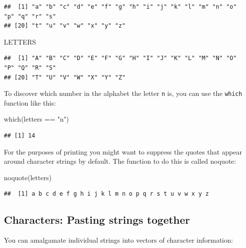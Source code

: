 \documentclass[
]{book}
\newenvironment{Shaded}{\begin{snugshade}}{\end{snugshade}}
\newcommand{\FunctionTok}[1]{\textcolor[rgb]{0.00,0.00,0.00}{#1}}
\newcommand{\NormalTok}[1]{#1}
\newcommand{\SpecialCharTok}[1]{\textcolor[rgb]{0.00,0.00,0.00}{#1}}
\newcommand{\StringTok}[1]{\textcolor[rgb]{0.31,0.60,0.02}{#1}}
\theoremstyle{definition}
\theoremstyle{definition}
\theoremstyle{definition}
\theoremstyle{definition}
\theoremstyle{remark}
\begin{document}
\begin{verbatim}
##  [1] "a" "b" "c" "d" "e" "f" "g" "h" "i" "j" "k" "l" "m" "n" "o" "p" "q" "r" "s"
## [20] "t" "u" "v" "w" "x" "y" "z"
\end{verbatim}

\begin{Shaded}
\begin{Highlighting}[]
\NormalTok{LETTERS}
\end{Highlighting}
\end{Shaded}

\begin{verbatim}
##  [1] "A" "B" "C" "D" "E" "F" "G" "H" "I" "J" "K" "L" "M" "N" "O" "P" "Q" "R" "S"
## [20] "T" "U" "V" "W" "X" "Y" "Z"
\end{verbatim}

To discover which number in the alphabet the letter \texttt{n} is, you can use the \texttt{which} function like this:

\begin{Shaded}
\begin{Highlighting}[]
\FunctionTok{which}\NormalTok{(letters }\SpecialCharTok{==} \StringTok{"n"}\NormalTok{)}
\end{Highlighting}
\end{Shaded}

\begin{verbatim}
## [1] 14
\end{verbatim}

For the purposes of printing you might want to suppress the quotes that appear around character strings by default. The function to do this is called noquote:

\begin{Shaded}
\begin{Highlighting}[]
\FunctionTok{noquote}\NormalTok{(letters)}
\end{Highlighting}
\end{Shaded}

\begin{verbatim}
##  [1] a b c d e f g h i j k l m n o p q r s t u v w x y z
\end{verbatim}

\hypertarget{characters-pasting-strings-together}{%
\subsection{Characters: Pasting strings together}\label{characters-pasting-strings-together}}

You can amalgamate individual strings into vectors of character information:
\end{document}
